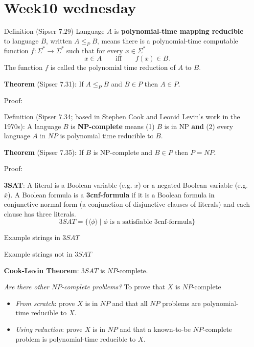 \documentclass[12pt, oneside]{article}
\begin{document}
\vfill
\newpage
 \vfill
\section*{Week10 wednesday}



Definition (Sipser 7.29) Language  $A$ is {\bf polynomial-time mapping reducible} to language $B$, written $A \leq_P B$,
means there is a polynomial-time computable function $f: \Sigma^* \to \Sigma^*$  such that for every $x \in \Sigma^*$
\[
x \in A \qquad \text{iff} \qquad f(x) \in B.
\]
The  function $f$ is  called the  polynomial time reduction of $A$ to $B$.

{\bf  Theorem}  (Sipser 7.31):  If $A \leq_P B$ and $B  \in P$ then $A \in P$.

Proof: 

\vfill

Definition (Sipser 7.34; based in Stephen Cook and Leonid Levin's work in the 1970s): 
A language $B$ is {\bf  NP-complete} means (1) $B$ is in NP {\bf and}  (2) every language
$A$ in $NP$ is polynomial time reducible to $B$.

{\bf  Theorem}  (Sipser 7.35):  If $B$ is NP-complete and $B \in P$ then $P = NP$.

Proof: 

\vfill

\newpage

{\bf 3SAT}: A literal is a Boolean variable (e.g.  $x$) or a negated Boolean variable (e.g.  $\bar{x}$).  
A Boolean formula is a {\bf  3cnf-formula} if it is a Boolean formula in conjunctive normal form (a conjunction  
of  disjunctive clauses of literals) and each clause  has  three literals.
\[
3SAT  = \{  \langle  \phi \rangle \mid \text{$\phi$ is  a  satisfiable 3cnf-formula} \}
\]


Example strings  in $3SAT$
\vfill



Example  strings not  in $3SAT$

\vfill




{\bf Cook-Levin Theorem}: $3SAT$ is $NP$-complete.


{\it Are there other $NP$-complete problems?} To prove that $X$ is $NP$-complete
\begin{itemize}
\item {\it From scratch}: prove $X$ is in $NP$ and that all $NP$ problems are polynomial-time
reducible to $X$.
\item {\it Using reduction}: prove $X$ is in $NP$ and that a known-to-be $NP$-complete problem 
is polynomial-time reducible to $X$.
\end{itemize}
\end{document}

